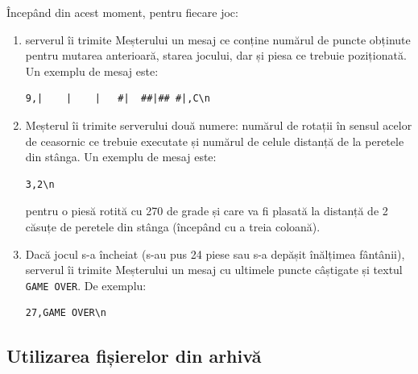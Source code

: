 \documentclass[12pt]{article}
\begin{document}
Începând din acest moment, pentru fiecare joc:
\begin{enumerate}
\item serverul îi trimite Meșterului un mesaj ce conține numărul de
  puncte obținute pentru mutarea anterioară, starea jocului, dar și
  piesa ce trebuie poziționată. Un exemplu de mesaj este:
\begin{verbatim}
9,|    |    |   #|  ##|## #|,C\n
\end{verbatim}
\item Meșterul îi trimite serverului două numere: numărul de rotații
  în sensul acelor de ceasornic ce trebuie executate și numărul de
  celule distanță de la peretele din stânga. Un exemplu de mesaj este:
\begin{verbatim}
3,2\n
\end{verbatim}
  pentru o piesă rotită cu 270 de grade și care va fi plasată la
  distanță de 2 căsuțe de peretele din stânga (începând cu a treia
  coloană).
\item Dacă jocul s-a încheiat (s-au pus 24 piese sau s-a depășit
  înălțimea fântânii), serverul îi trimite Meșterului un mesaj cu
  ultimele puncte câștigate și textul \texttt{GAME OVER}. De exemplu:
\begin{verbatim}
27,GAME OVER\n
\end{verbatim}
\end{enumerate}

\subsection{Utilizarea fișierelor din arhivă}
\label{sec:scripts}
\end{document}
